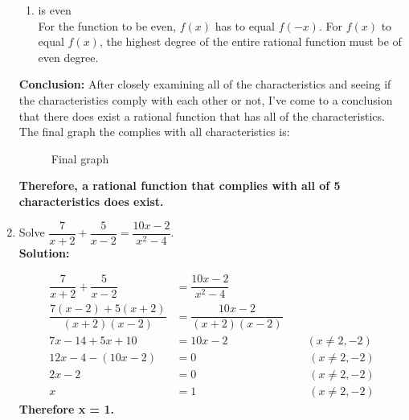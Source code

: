 \documentclass[12pt]{book}
\begin{document}
\begin{enumerate}
\begin{enumerate}
\item is even\\

For the function to be even, $f(x)$ has to equal $f(-x)$. For $f(x)$ to equal $f(x)$, the highest degree of the entire rational function must be of even degree.
\end{enumerate}
\newpage

\textbf{Conclusion:} After closely examining all of the characteristics and seeing if the characteristics comply with each other or not, I've come to a conclusion that there does exist a rational function that has all of the characteristics. The final graph the complies with all characteristics is:
\begin{figure}[H]
\caption{Final graph}
\end{figure} 

\textbf{Therefore, a rational function that complies with all of 5 characteristics does exist.}

\newpage

\item Solve $\dfrac{7}{x+2} + \dfrac{5}{x-2} = \dfrac{10x-2}{x^2 - 4}$.\\

\textbf{Solution:}

\begingroup
\addtolength{\jot}{1em}
\begin{align*}
    \dfrac{7}{x+2} + \dfrac{5}{x-2} &= \dfrac{10x-2}{x^2 - 4}\\
    \dfrac{7(x-2) + 5(x+2)}{(x+2)(x-2)} &= \dfrac{10x-2}{(x+2)(x-2)}\\
    7x-14+5x+10 &= 10x - 2\qquad\qquad\qquad\quad(x \neq 2, -2)\\
    12x-4-(10x-2) &= 0\qquad\qquad\qquad\qquad\qquad(x \neq 2, -2)\\
    2x-2 &= 0\qquad\qquad\qquad\qquad\qquad(x \neq 2, -2)\\
    x &= 1\qquad\qquad\qquad\qquad\qquad(x \neq 2, -2)
\end{align*}
\endgroup
\textbf{Therefore x = 1.}


\end{enumerate}
\end{document}
